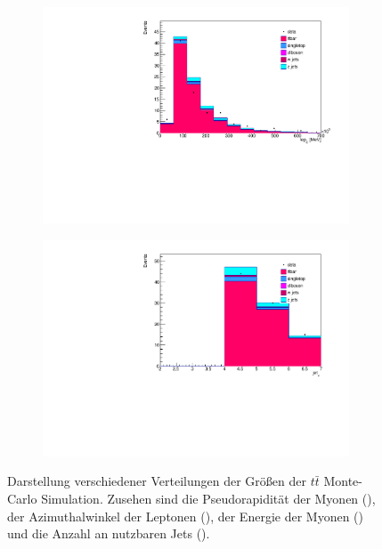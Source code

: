 \begin{figure}[h]
\begin{subfigure}{0.5\textwidth}
    \caption{}
    \label{fig:stacked_btagged2}
  \end{subfigure}%
  \newline
  \begin{subfigure}{0.5\textwidth}
    \centering
    \includegraphics[width=\linewidth]{plots_and_txt/stacked_plots/stacked_lep_E.pdf}
    \caption{}
    \label{fig:stacked_jet_pt_good2}
  \end{subfigure}%
  \begin{subfigure}{0.5\textwidth}
    \centering
    \includegraphics[width=\linewidth]{plots_and_txt/stacked_plots/stacked_jet_n.pdf}
    \caption{}
    \label{fig:stacked_met_et2}
  \end{subfigure}%
  \caption{Darstellung verschiedener Verteilungen der Größen der $t\bar{t}$ Monte-Carlo Simulation.
  Zusehen sind die Pseudorapidität der Myonen (), 
  der Azimuthalwinkel der Leptonen (), 
  der Energie der Myonen () und die Anzahl an nutzbaren Jets ().
  }
  \label{fig:stacked_Distributions2}
\end{figure}

